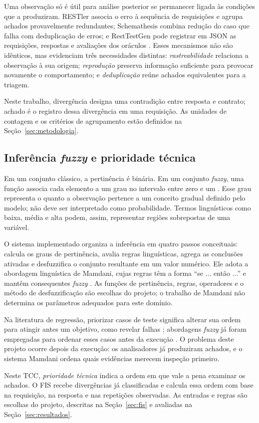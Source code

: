 Uma observação só é útil para análise posterior se permanecer ligada às
condições que a produziram. RESTler associa o erro à sequência de requisições e
agrupa achados provavelmente redundantes; Schemathesis combina redução do
caso que falha com deduplicação de erros; e RestTestGen pode registrar em JSON
as requisições, respostas e avaliações dos oráculos
\cite{atlidakis2019restler,hatfielddodds2021schemathesis,corradini2022resttestgen}.
Esses mecanismos não são idênticos, mas evidenciam três necessidades distintas:
\emph{rastreabilidade} relaciona a observação à sua origem;
\emph{reprodução} preserva informação suficiente para provocar novamente o
comportamento; e \emph{deduplicação} reúne achados equivalentes para a
triagem.

Neste trabalho, divergência designa uma contradição entre resposta e contrato;
achado é o registro dessa divergência em uma requisição. As unidades de
contagem e os critérios de agrupamento estão definidos na
Seção~\ref{sec:metodologia}.

\subsection{Inferência \textit{fuzzy} e prioridade técnica}

Em um conjunto clássico, a pertinência é binária. Em um conjunto \textit{fuzzy}, uma
função associa cada elemento a um grau no intervalo entre zero e um
\cite{zadeh1965fuzzy}. Esse grau representa o quanto a observação pertence a um
conceito gradual definido pelo modelo; não deve ser interpretado como
probabilidade. Termos linguísticos como baixa, média e alta podem, assim,
representar regiões sobrepostas de uma variável.

O sistema implementado organiza a inferência em quatro passos conceituais:
calcula os graus de pertinência, avalia regras linguísticas, agrega as
conclusões ativadas e desfuzzifica o conjunto resultante em um valor numérico.
Ele adota a abordagem linguística de Mamdani, cujas regras têm a forma ``se ...
então ...'' e mantêm consequentes \textit{fuzzy} \cite{mamdani1975}. As funções de
pertinência, regras, operadores e o método de desfuzzificação são escolhas do
projeto; o trabalho de Mamdani não determina os parâmetros adequados para
este domínio.

Na literatura de regressão, priorizar
casos de teste significa alterar sua ordem para atingir antes um objetivo, como
revelar falhas \cite{elbaum2002prioritization}; abordagens \textit{fuzzy} já foram
empregadas para ordenar esses casos antes da execução
\cite{alakeel2014fuzzy}. O problema deste projeto ocorre depois da execução: os
analisadores já produziram achados, e o sistema Mamdani ordena quais evidências
merecem inspeção primeiro.

Neste TCC, \emph{prioridade técnica} indica a ordem em que vale a pena
examinar os achados. O FIS recebe divergências já classificadas e calcula essa
ordem com base na requisição, na resposta e nas repetições observadas. As
entradas e regras são escolhas do projeto, descritas na
Seção~\ref{sec:fis} e avaliadas na Seção~\ref{sec:resultados}.
